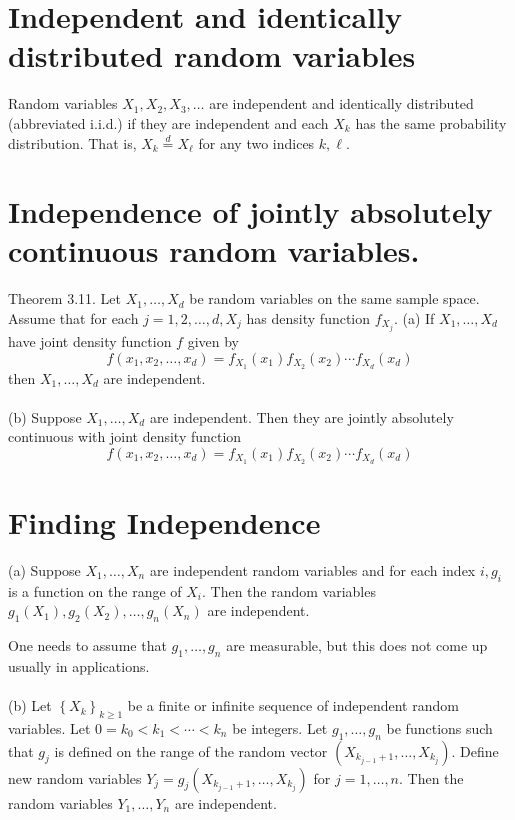 \documentclass[11pt]{elegantbook}
\begin{document}
\section{Independent and identically distributed random variables}
\begin{definition}
   Random variables $X_1, X_2, X_3, \ldots$ are independent and identically distributed (abbreviated i.i.d.) if they are independent and each $X_k$ has the same probability distribution. That is, $X_k \stackrel{d}{=} X_{\ell}$ for any two indices $k, \ell . $
\end{definition}
\section{Independence of jointly absolutely continuous random variables.}

\begin{theorem}
    Theorem 3.11. Let $X_1, \ldots, X_d$ be random variables on the same sample space. Assume that for each $j=1,2, \ldots, d, X_j$ has density function $f_{X_j}$.
(a) If $X_1, \ldots, X_d$ have joint density function $f$ given by
$$
f\left(x_1, x_2, \ldots, x_d\right)=f_{X_1}\left(x_1\right) f_{X_2}\left(x_2\right) \cdots f_{X_d}\left(x_d\right)
$$
then $X_1, \ldots, X_d$ are independent.\\\\
(b) Suppose $X_1, \ldots, X_d$ are independent. Then they are jointly absolutely continuous with joint density function
$$
f\left(x_1, x_2, \ldots, x_d\right)=f_{X_1}\left(x_1\right) f_{X_2}\left(x_2\right) \cdots f_{X_d}\left(x_d\right)
$$
\end{theorem}

\section{Finding Independence}

\begin{theorem}
(a)
Suppose $X_1, \ldots, X_n$ are independent random variables and for each index $i, g_i$ is a function on the range of $X_i$. Then the random variables $g_1\left(X_1\right), g_2\left(X_2\right), \ldots, g_n\left(X_n\right)$ are independent.

One needs to assume that $g_1, \ldots, g_n$ are measurable, but this does not come up usually in applications.\\ \\
(b) Let $\left\{X_k\right\}_{k \geq 1}$ be a finite or infinite sequence of independent random variables. Let $0=k_0<k_1<\cdots<k_n$ be integers. Let $g_1, \ldots, g_n$ be functions such that $g_j$ is defined on the range of the random vector $\left(X_{k_{j-1}+1}, \ldots, X_{k_j}\right)$. Define new random variables $Y_j=g_j\left(X_{k_{j-1}+1}, \ldots, X_{k_j}\right)$ for $j=1, \ldots, n$. Then the random variables $Y_1, \ldots, Y_n$ are independent.
\end{theorem}
\end{document}
